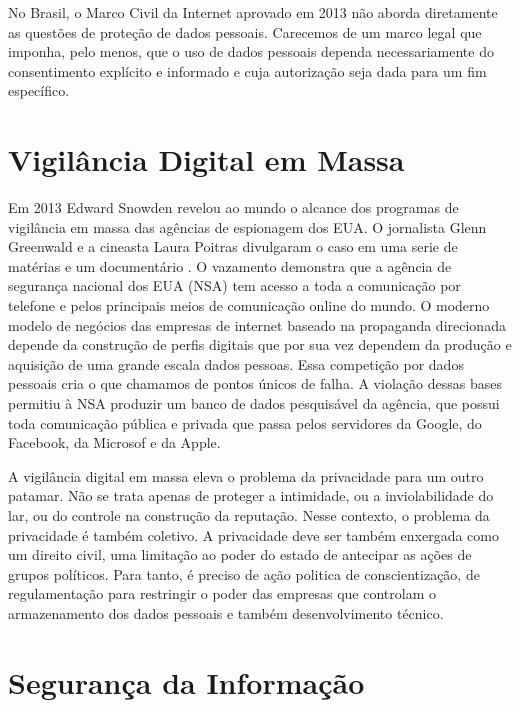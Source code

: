 No Brasil, o Marco Civil da Internet aprovado em 2013 não aborda diretamente as questões de proteção de dados pessoais.
Carecemos de um marco legal que imponha, pelo menos, que o uso de dados pessoais dependa necessariamente do consentimento explícito e informado e cuja autorização seja dada para um fim específico.

\section{Vigilância Digital em Massa}
\label{sec:vigil-digital}

Em 2013 Edward Snowden revelou ao mundo o alcance dos programas de vigilância em massa das agências de espionagem dos EUA.
O jornalista Glenn Greenwald e a cineasta Laura Poitras divulgaram o caso em uma serie de matérias e um documentário \cite{Greenwald14, Poitras14}.
O vazamento demonstra que a agência de segurança nacional dos EUA (NSA) tem acesso a toda a comunicação por telefone e pelos principais meios de comunicação online do mundo.
O moderno modelo de negócios das empresas de internet baseado na propaganda direcionada depende da construção de perfis digitais que por sua vez dependem da produção e aquisição de uma grande escala dados pessoas.
Essa competição por dados pessoais cria o que chamamos de pontos únicos de falha.
A violação dessas bases permitiu à NSA produzir um banco de dados pesquisável da agência, que possui toda comunicação pública e privada que passa pelos servidores da Google, do Facebook, da Microsof e da Apple.

A vigilância digital em massa eleva o problema da privacidade para um outro patamar.
Não se trata apenas de proteger a intimidade, ou a inviolabilidade do lar, ou do controle na construção da reputação. 
Nesse contexto, o problema da privacidade é também coletivo.
A privacidade deve ser também enxergada como um direito civil, uma limitação ao poder do estado de antecipar as ações de grupos políticos. 
Para tanto, é preciso de ação politica de conscientização, de regulamentação para restringir o poder das empresas que controlam o armazenamento dos dados pessoais e também desenvolvimento técnico. 

\section{Segurança da Informação}
\label{sec:seg-inf}

